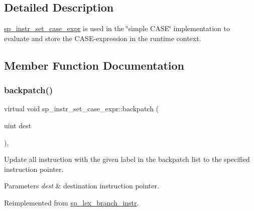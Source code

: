 \subsection{Detailed Description}
\mbox{\hyperlink{classsp__instr__set__case__expr}{sp\+\_\+instr\+\_\+set\+\_\+case\+\_\+expr}} is used in the \char`\"{}simple C\+A\+S\+E\char`\"{} implementation to evaluate and store the C\+A\+SE-\/expression in the runtime context. 

\subsection{Member Function Documentation}
\mbox{\label{classsp__instr__set__case__expr_a5d4c9c2460d84b449e5796186407b7b4}} 
\subsubsection{\texorpdfstring{backpatch()}{backpatch()}}
{\footnotesize\ttfamily virtual void sp\+\_\+instr\+\_\+set\+\_\+case\+\_\+expr\+::backpatch (\begin{DoxyParamCaption}\item[{uint}]{dest }\end{DoxyParamCaption})\hspace{0.3cm}{\ttfamily [inline]}, {\ttfamily [virtual]}}

Update all instruction with the given label in the backpatch list to the specified instruction pointer.


\begin{DoxyParams}{Parameters}
{\em dest} & destination instruction pointer. \\
\hline
\end{DoxyParams}


Reimplemented from \mbox{\hyperlink{classsp__lex__branch__instr_a0a28016e4c51d49eb9ff014b0afa7703}{sp\+\_\+lex\+\_\+branch\+\_\+instr}}.

\mbox{\label{classsp__instr__set__case__expr_a986c16ff3c1be65fe0653dda3104b0d8}} 
